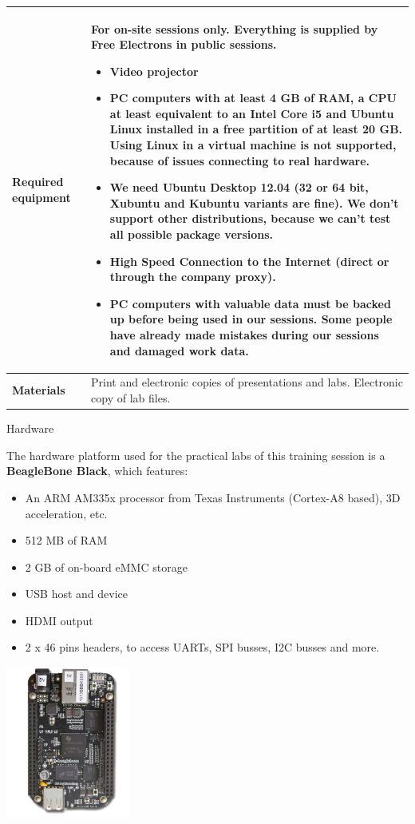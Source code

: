 \documentclass[a4paper,12pt,obeyspaces,spaces,hyphens]{article}
\begin{document}
{\begin{tabularx}{\textwidth}{|g|h|}
    {\bf Required equipment} &
    {\bf For on-site sessions only.}
    \newline Everything is supplied by Free Electrons in public
    sessions.
    \begin{itemize}
    \item Video projector
    \item PC computers with at least 4 GB of RAM, a CPU at least
      equivalent to an Intel Core i5 and Ubuntu Linux
    installed in a {\bf free partition of at least 20 GB. Using Linux
      in a virtual machine is not supported}, because of issues
    connecting to real hardware.
    \item We need Ubuntu Desktop 12.04 (32 or 64 bit, Xubuntu and
    Kubuntu variants are fine). We don't support other
    distributions, because we can't test all possible package versions.
    \item {\bf High Speed Connection to the Internet} (direct or through the
    company proxy).
    \item {\bf PC computers with valuable data must be backed up}
    before being used in our sessions.  Some people have already made
    mistakes during our sessions and damaged work data.
    \end{itemize} \\
    \hline

    {\bf Materials} & Print and electronic copies of presentations and
    labs.
    \newline Electronic copy of lab files.\\
    \hline

\end{tabularx}}
\normalsize

\feagendatwocolumn
{Hardware}
{
  The hardware platform used for the practical labs of this training
  session is a {\bf BeagleBone Black}, which features:

  \begin{itemize}
  \item An ARM AM335x processor from Texas Instruments (Cortex-A8
    based), 3D acceleration, etc.
  \item 512 MB of RAM
  \item 2 GB of on-board eMMC storage
  \item USB host and device
  \item HDMI output
  \item 2 x 46 pins headers, to access UARTs, SPI busses, I2C busses
    and more.
  \end{itemize}
}
{}
{
  \begin{center}
    \includegraphics[height=5cm]{agenda/beagleboneblack.png}
  \end{center}
}
\end{document}
